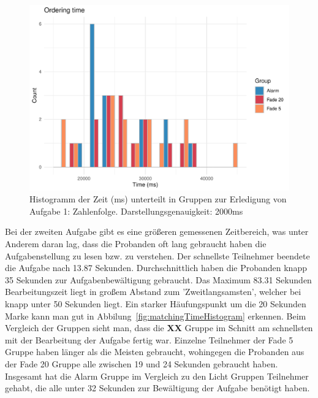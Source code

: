 \begin{figure}[H]
	\centering
	\includegraphics[width=\textwidth]{./_StudyResults/orderingTimeHist}
	\caption{Histogramm der Zeit (ms) unterteilt in Gruppen zur Erledigung von Aufgabe 1: Zahlenfolge. Darstellungsgenauigkeit: 2000ms}
	\label{fig:orderingTimeHistogram}
\end{figure}

Bei der zweiten Aufgabe gibt es eine größeren gemessenen Zeitbereich, was unter Anderem daran lag, dass die Probanden oft lang gebraucht haben die Aufgabenstellung zu lesen bzw. zu verstehen. Der schnellste Teilnehmer beendete die Aufgabe nach 13.87 Sekunden. Durchschnittlich haben die Probanden knapp 35 Sekunden zur Aufgabenbewältigung gebraucht. Das Maximum 83.31 Sekunden Bearbeitungszeit liegt in großem Abstand zum 'Zweitlangsamsten', welcher bei knapp unter 50 Sekunden liegt. Ein starker Häufungspunkt um die 20 Sekunden Marke kann man gut in Abbilung~\ref{fig:matchingTimeHistogram} erkennen. 
Beim Vergleich der Gruppen sieht man, dass die \textbf{XX} Gruppe im Schnitt am schnellsten mit der Bearbeitung der Aufgabe fertig war. Einzelne Teilnehmer der Fade 5 Gruppe haben länger als die Meisten gebraucht, wohingegen die Probanden aus der Fade 20 Gruppe alle zwischen 19 und 24 Sekunden gebraucht haben. Insgesamt hat die Alarm Gruppe im Vergleich zu den Licht Gruppen Teilnehmer gehabt, die alle unter 32 Sekunden zur Bewältigung der Aufgabe benötigt haben.

